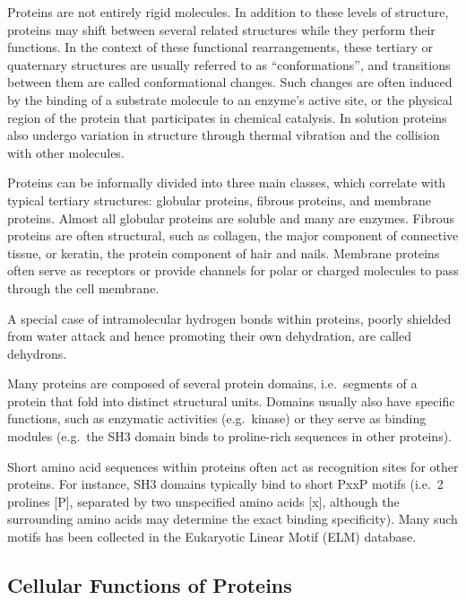 Proteins are not entirely rigid molecules. In addition to these levels of structure, proteins may shift between several related structures while they perform their functions. In the context of these functional rearrangements, these tertiary or quaternary structures are usually referred to as ``conformations'', and transitions between them are called conformational changes. Such changes are often induced by the binding of a substrate molecule to an enzyme's active site, or the physical region of the protein that participates in chemical catalysis. In solution proteins also undergo variation in structure through thermal vibration and the collision with other molecules.

Proteins can be informally divided into three main classes, which correlate with typical tertiary structures: globular proteins, fibrous proteins, and membrane proteins. Almost all globular proteins are soluble and many are enzymes. Fibrous proteins are often structural, such as collagen, the major component of connective tissue, or keratin, the protein component of hair and nails. Membrane proteins often serve as receptors or provide channels for polar or charged molecules to pass through the cell membrane.

A special case of intramolecular hydrogen bonds within proteins, poorly shielded from water attack and hence promoting their own dehydration, are called dehydrons.

Many proteins are composed of several protein domains, i.e.~segments of a protein that fold into distinct structural units. Domains usually also have specific functions, such as enzymatic activities (e.g.~kinase) or they serve as binding modules (e.g.~the SH3 domain binds to proline-rich sequences in other proteins).

Short amino acid sequences within proteins often act as recognition sites for other proteins. For instance, SH3 domains typically bind to short PxxP motifs (i.e.~2 prolines {[}P{]}, separated by two unspecified amino acids {[}x{]}, although the surrounding amino acids may determine the exact binding specificity). Many such motifs has been collected in the Eukaryotic Linear Motif (ELM) database.

\hypertarget{cellular-functions-of-proteins}{%
\subsection{Cellular Functions of Proteins}\label{cellular-functions-of-proteins}}


